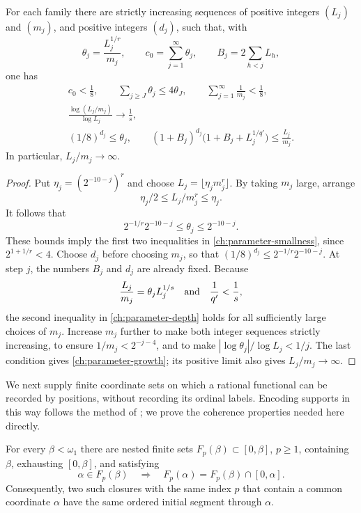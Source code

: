 \begin{lemma}\label{ch:parameters}
For each family there are strictly increasing sequences of positive
integers $(L_j)$ and $(m_j)$, and positive integers $(d_j)$, such that,
with
\[
 \theta_j=\frac{L_j^{1/r}}{m_j},\qquad
 c_0=\sum_{j=1}^{\infty}\theta_j,\qquad
 B_j=2\sum_{h<j}L_h,
\]
one has
\begin{gather}
 c_0<\frac18,\qquad
 \sum_{j\ge J}\theta_j\le4\theta_J,\qquad
 \sum_{j=1}^{\infty}\frac1{m_j}<\frac18,
 \label{ch:parameter-smallness}\\
 \frac{\log(L_j/m_j)}{\log L_j}\longrightarrow\frac1s,
 \label{ch:parameter-growth}\\
 (1/8)^{d_j}\le\theta_j,\qquad
 (1+B_j)^{d_j}\bigl(1+B_j+L_j^{1/q'}\bigr)
 \le\frac{L_j}{m_j}.
 \label{ch:parameter-depth}
\end{gather}
In particular, $L_j/m_j\to\infty$.
\end{lemma}

\begin{proof}
Put $\eta_j=(2^{-10-j})^r$ and choose
$L_j=\lfloor\eta_jm_j^r\rfloor$.  By taking $m_j$ large, arrange
\[
 \eta_j/2\le L_j/m_j^r\le\eta_j.
\]
It follows that
\[
 2^{-1/r}2^{-10-j}\le\theta_j\le2^{-10-j}.
\]
These bounds imply the first two inequalities in
\eqref{ch:parameter-smallness}, since
$2^{1+1/r}<4$.  Choose $d_j$ before choosing $m_j$, so that
$(1/8)^{d_j}\le2^{-1/r}2^{-10-j}$.
At step $j$, the numbers $B_j$ and $d_j$ are already fixed.  Because
\[
 \frac{L_j}{m_j}=\theta_jL_j^{1/s}
 \quad\hbox{and}\quad \frac1{q'}<\frac1s,
\]
the second inequality in \eqref{ch:parameter-depth} holds for all
sufficiently large choices of $m_j$.  Increase $m_j$ further to make both
integer sequences strictly increasing, to ensure
$1/m_j<2^{-j-4}$, and to make $|\log\theta_j|/\log L_j<1/j$.
The last condition gives \eqref{ch:parameter-growth}; its positive limit
also gives $L_j/m_j\to\infty$.
\end{proof}

We next supply finite coordinate sets on which a rational functional can
be recorded by positions, without recording its ordinal labels.
Encoding supports in this way follows the method of
\cite[Sections~2.3--2.4]{ArgyrosLopezAbadTodorcevic2005}; we prove the
coherence properties needed here directly.

\begin{lemma}\label{ch:closures}
For every $\beta<\omega_1$ there are nested finite sets
$F_p(\beta)\subset[0,\beta]$, $p\ge1$, containing $\beta$, exhausting
$[0,\beta]$, and satisfying
\begin{equation}
 \alpha\in F_p(\beta)
 \quad\Longrightarrow\quad
 F_p(\alpha)=F_p(\beta)\cap[0,\alpha].
 \label{ch:coherence}
\end{equation}
Consequently, two such closures with the same index $p$ that contain a
common coordinate $\alpha$ have the same ordered initial segment through
$\alpha$.
\end{lemma}


